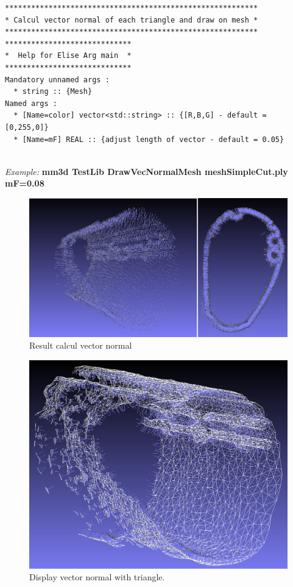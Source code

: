 \begin{verbatim}
**********************************************************
* Calcul vector normal of each triangle and draw on mesh *
**********************************************************
*****************************
*  Help for Elise Arg main  *
*****************************
Mandatory unnamed args : 
  * string :: {Mesh}
Named args : 
  * [Name=color] vector<std::string> :: {[R,B,G] - default = [0,255,0]}
  * [Name=mF] REAL :: {adjust length of vector - default = 0.05}


\end{verbatim}
\textit{Example:}
\textbf{mm3d TestLib DrawVecNormalMesh meshSimpleCut.ply mF=0.08}

\begin{figure}[H]
\centering
\includegraphics[width=15cm]{FIGS/MeshProjOnImg/VecNorMal1.png}
\caption{Result calcul vector normal}
\label{SurfCorr}
\end{figure}

\begin{figure}[H]
\centering
\includegraphics[width=15cm]{FIGS/MeshProjOnImg/VecNormalWMesh.png}
\caption{Display vector normal with triangle.}
\label{SurfCorr}
\end{figure}


